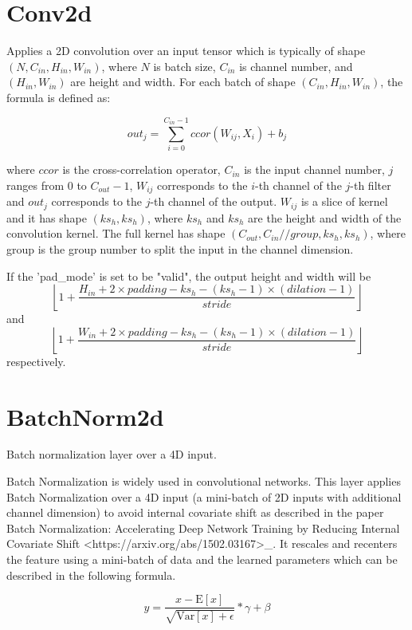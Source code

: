 \documentclass{article}
\begin{document}
\section{Conv2d}
Applies a 2D convolution over an input tensor which is typically of shape $(N, C_{in}, H_{in}, W_{in})$,
   where $N$ is batch size, $C_{in}$ is channel number, and $(H_{in}, W_{in})$ are height and width.
   For each batch of shape $(C_{in}, H_{in}, W_{in})$, the formula is defined as:
  
       $$out_j = \sum_{i=0}^{C_{in} - 1} ccor(W_{ij}, X_i) + b_j$$
 
   where $ccor$ is the cross-correlation operator, $C_{in}$ is the input channel number, $j$ ranges
   from $0$ to $C_{out} - 1$, $W_{ij}$ corresponds to the $i$-th channel of the $j$-th
   filter and $out_{j}$ corresponds to the $j$-th channel of the output. $W_{ij}$ is a slice
   of kernel and it has shape $( ks_h,  ks_h)$, where $ ks_h$ and
   $ ks_h$ are the height and width of the convolution kernel. The full kernel has shape
   $(C_{out}, C_{in} //  group,  ks_h,  ks_h)$, where group is the group number
   to split the input in the channel dimension.
 
   If the 'pad\_mode' is set to be "valid", the output height and width will be
   $$\left \lfloor{1 + \frac{H_{in} + 2 \times  padding -  ks_h - ( ks_h - 1) \times ( dilation - 1) }{ stride}} \right \rfloor$$ 
   and
   $$\left \lfloor{1 + \frac{W_{in} + 2 \times  padding -  ks_h - ( ks_h - 1) \times ( dilation - 1) }{ stride}} \right \rfloor$$    respectively.

\section{BatchNorm2d}
Batch normalization layer over a 4D input.

    Batch Normalization is widely used in convolutional networks. This layer
    applies Batch Normalization over a 4D input (a mini-batch of 2D inputs with
    additional channel dimension) to avoid internal covariate shift as described
    in the paper Batch Normalization: Accelerating Deep Network Training by
    Reducing Internal Covariate Shift <https://arxiv.org/abs/1502.03167>\_. It
    rescales and recenters the feature using a mini-batch of data and
    the learned parameters which can be described in the following formula.

        $$y = \frac{x - \mathrm{E}[x]}{\sqrt{\mathrm{Var}[x] + \epsilon}} * \gamma + \beta$$
\end{document}

